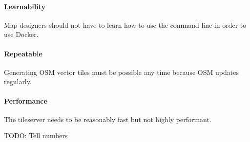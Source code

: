 \paragraph{Learnability}

Map designers should not have to learn how to use the command line in
order to use Docker.

\paragraph{Repeatable}

Generating OSM vector tiles must be possible any time because OSM
updates regularly.

\paragraph{Performance}

The tileserver needs to be reasonably fast but not highly performant.

TODO: Tell numbers